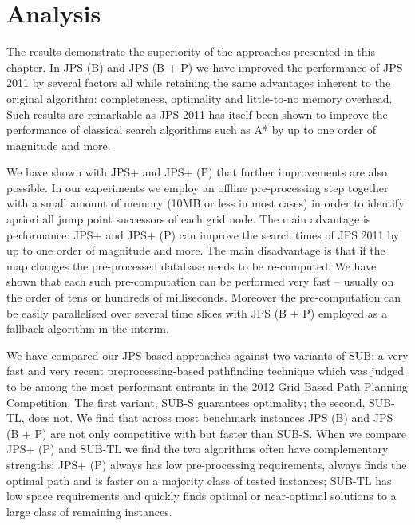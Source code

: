 \section{Analysis}
The results demonstrate the superiority of the approaches presented in this
chapter. In JPS (B) and JPS (B + P) we have improved the performance of
JPS 2011 by several factors all while retaining
the same advantages inherent to the original algorithm: completeness, 
optimality and little-to-no memory overhead. Such results are remarkable as
JPS 2011 has itself been shown to improve the performance of classical
search algorithms such as A* by up to one order of magnitude and more.

We have shown with JPS+ and JPS+ (P) that further improvements are also possible. 
In our experiments we employ an offline pre-processing step together with a small 
amount of memory (10MB or less in most cases) in order to identify apriori all jump 
point successors of each grid node.
The main advantage is performance: JPS+ and JPS+ (P) can improve the search times of 
JPS 2011 by up to one order of magnitude and more.
The main disadvantage is that if the map changes the pre-processed
database needs to be re-computed. We have shown that each such pre-computation
can be performed very fast -- usually on the order of tens or hundreds of 
milliseconds. Moreover the pre-computation can be easily parallelised over
several time slices with JPS (B + P) employed as a fallback algorithm in
the interim.

We have compared our JPS-based approaches against two variants of SUB: a very fast 
and very recent preprocessing-based pathfinding technique which was judged to be 
among the most performant entrants in the 2012 Grid Based Path Planning Competition. 
The first variant, SUB-S guarantees optimality; the second, SUB-TL, does not. 
We find that across most benchmark instances JPS (B) and 
JPS (B + P) are not only competitive with but faster than SUB-S. When we compare
JPS+ (P) and SUB-TL we find the two algorithms often have complementary strengths:
JPS+ (P) always has low pre-processing requirements, always finds the optimal path
and is faster on a majority class of tested instances; SUB-TL has low space
requirements and quickly finds optimal or near-optimal solutions to a large class 
of remaining instances.

